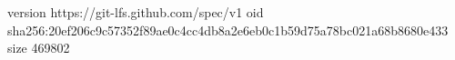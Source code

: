 version https://git-lfs.github.com/spec/v1
oid sha256:20ef206c9c57352f89ae0c4cc4db8a2e6eb0c1b59d75a78bc021a68b8680e433
size 469802
